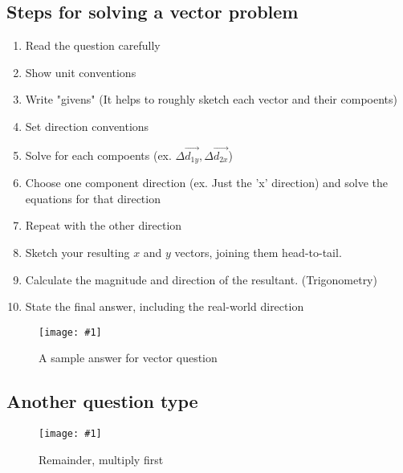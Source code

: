 \documentclass[11pt]{report}
\theoremstyle{remark}
\newcommand{\mypic}[3]{
    \begin{figure}[h!]
        \centering
        \texttt{[image: \#1]}
        \caption{#2}
    \end{figure}
}
\begin{document}
\subsection{Steps for solving a vector problem}
\begin{enumerate}
    \item Read the question carefully
    \item Show unit conventions
    \item Write "givens" (It helps to roughly sketch each vector and their compoents)
    \item Set direction conventions
    \item Solve for each compoents (ex. $\Delta\vec{d_{1y}}, \Delta\vec{d_{2x}}$)
    \item Choose one component direction (ex. Just the 'x' direction) and solve the equations for that direction
    \item Repeat with the other direction
    \item Sketch your resulting $x$ and $y$ vectors, joining them head-to-tail. 
    \item Calculate the magnitude and direction of the resultant. (Trigonometry)
    \item State the final answer, including the real-world direction
\end{enumerate}

\mypic{graph/graph1.png}{A sample answer for vector question}{0.8}

\subsection{Another question type}
\mypic{graph/teacherNote2.png}{Remainder, multiply first}{0.9}
\end{document}
